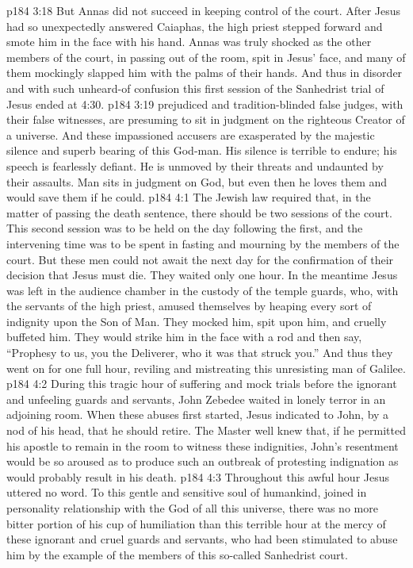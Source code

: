 \vs p184 3:18 But Annas did not succeed in keeping control of the court. After Jesus had so unexpectedly answered Caiaphas, the high priest stepped forward and smote him in the face with his hand. Annas was truly shocked as the other members of the court, in passing out of the room, spit in Jesus’ face, and many of them mockingly slapped him with the palms of their hands. And thus in disorder and with such unheard\hyp{}of confusion this first session of the Sanhedrist trial of Jesus ended at 4:30.
\vs p184 3:19  prejudiced and tradition\hyp{}blinded false judges, with their false witnesses, are presuming to sit in judgment on the righteous Creator of a universe. And these impassioned accusers are exasperated by the majestic silence and superb bearing of this God\hyp{}man. His silence is terrible to endure; his speech is fearlessly defiant. He is unmoved by their threats and undaunted by their assaults. Man sits in judgment on God, but even then he loves them and would save them if he could.
\vs p184 4:1 The Jewish law required that, in the matter of passing the death sentence, there should be two sessions of the court. This second session was to be held on the day following the first, and the intervening time was to be spent in fasting and mourning by the members of the court. But these men could not await the next day for the confirmation of their decision that Jesus must die. They waited only one hour. In the meantime Jesus was left in the audience chamber in the custody of the temple guards, who, with the servants of the high priest, amused themselves by heaping every sort of indignity upon the Son of Man. They mocked him, spit upon him, and cruelly buffeted him. They would strike him in the face with a rod and then say, “Prophesy to us, you the Deliverer, who it was that struck you.” And thus they went on for one full hour, reviling and mistreating this unresisting man of Galilee.
\vs p184 4:2 During this tragic hour of suffering and mock trials before the ignorant and unfeeling guards and servants, John Zebedee waited in lonely terror in an adjoining room. When these abuses first started, Jesus indicated to John, by a nod of his head, that he should retire. The Master well knew that, if he permitted his apostle to remain in the room to witness these indignities, John’s resentment would be so aroused as to produce such an outbreak of protesting indignation as would probably result in his death.
\vs p184 4:3 Throughout this awful hour Jesus uttered no word. To this gentle and sensitive soul of humankind, joined in personality relationship with the God of all this universe, there was no more bitter portion of his cup of humiliation than this terrible hour at the mercy of these ignorant and cruel guards and servants, who had been stimulated to abuse him by the example of the members of this so\hyp{}called Sanhedrist court.
